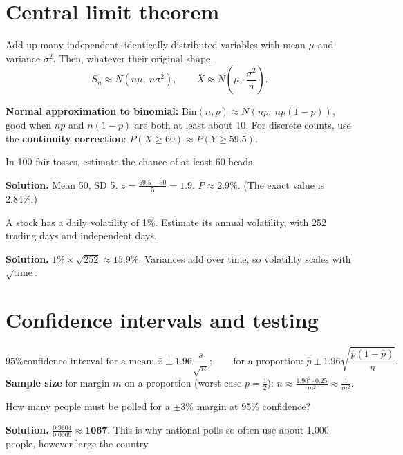 \documentclass[11pt,a4paper,openany]{report}
\begin{document}
\section{Central limit theorem}
\begin{idea}[CLT]
Add up many independent, identically distributed variables with mean $\mu$ and variance $\sigma^2$. Then, whatever their original shape,
\[S_n\approx N(n\mu,\ n\sigma^2),\qquad\bar X\approx N\left(\mu,\ \frac{\sigma^2}n\right).\]
\end{idea}
\textbf{Normal approximation to binomial:} $\text{Bin}(n,p)\approx N(np,\ np(1-p))$, good when $np$ and $n(1-p)$ are both at least about 10. For discrete counts, use the \textbf{continuity correction}: $P(X\ge60)\approx P(Y\ge59.5)$.

\begin{example}[coin]
In 100 fair tosses, estimate the chance of at least 60 heads.

\textbf{Solution.} Mean 50, SD 5. $z=\frac{59.5-50}5=1.9$. $P\approx\mathbf{2.9\%}$. (The exact value is 2.84\%.)
\end{example}

\begin{example}
A stock has a daily volatility of 1\%. Estimate its annual volatility, with 252 trading days and independent days.

\textbf{Solution.} $1\%\times\sqrt{252}\approx\mathbf{15.9\%}$. Variances add over time, so volatility scales with $\sqrt{\text{time}}$.
\end{example}

\section{Confidence intervals and testing}
\[\text{95\% confidence interval for a mean: }\bar x\pm1.96\frac s{\sqrt n};\qquad\text{for a proportion: }\hat p\pm1.96\sqrt{\frac{\hat p(1-\hat p)}n}.\]
\textbf{Sample size} for margin $m$ on a proportion (worst case $p=\frac12$): $n\approx\frac{1.96^2\cdot0.25}{m^2}\approx\frac1{m^2}$.

\begin{example}[poll]
How many people must be polled for a $\pm3\%$ margin at 95\% confidence?

\textbf{Solution.} $\frac{0.9604}{0.0009}\approx\mathbf{1067}$. This is why national polls so often use about 1,000 people, however large the country.
\end{example}
\end{document}
